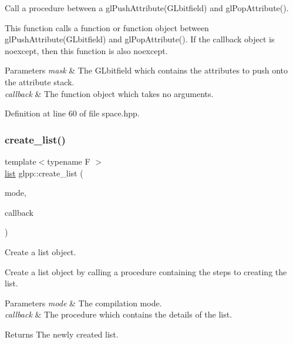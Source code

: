Call a procedure between a gl\+Push\+Attribute(\+G\+Lbitfield) and gl\+Pop\+Attribute(). 

This function calls a function or function object between gl\+Push\+Attribute(\+G\+Lbitfield) and gl\+Pop\+Attribute(). If the callback object is {\ttfamily noexcept}, then this function is also {\ttfamily noexcept}.


\begin{DoxyParams}{Parameters}
{\em mask} & The G\+Lbitfield which contains the attributes to push onto the attribute stack. \\
\hline
{\em callback} & The function object which takes no arguments. \\
\hline
\end{DoxyParams}


Definition at line 60 of file space.\+hpp.

\mbox{\label{namespaceglpp_ad2935327dd1a54de819bbab69ce44119}} 
\subsubsection{\texorpdfstring{create\+\_\+list()}{create\_list()}}
{\footnotesize\ttfamily template$<$typename F $>$ \\
\hyperlink{classglpp_1_1list}{list} glpp\+::create\+\_\+list (\begin{DoxyParamCaption}\item[{\hyperlink{namespaceglpp_ae04b58b8004d97440233b5c65fe75748}{list\+\_\+mode}}]{mode,  }\item[{F}]{callback }\end{DoxyParamCaption})\hspace{0.3cm}{\ttfamily [inline]}}



Create a list object. 

Create a list object by calling a procedure containing the steps to creating the list.


\begin{DoxyParams}{Parameters}
{\em mode} & The compilation mode. \\
\hline
{\em callback} & The procedure which contains the details of the list. \\
\hline
\end{DoxyParams}
\begin{DoxyReturn}{Returns}
The newly created list. 
\end{DoxyReturn}

